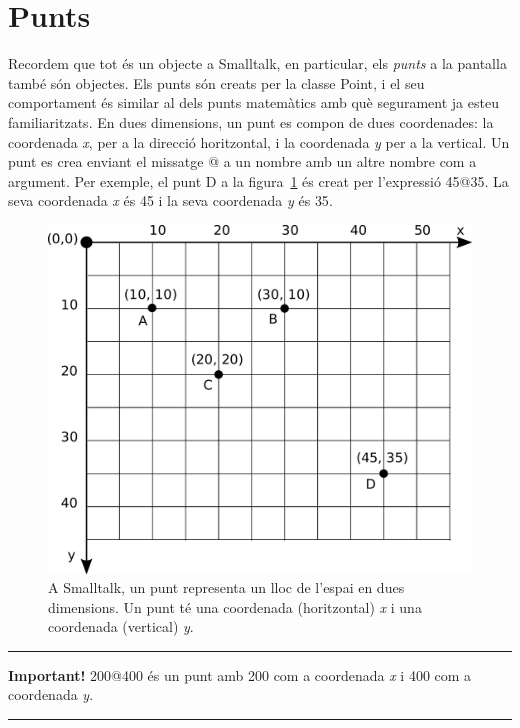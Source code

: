 \section{Punts}
Recordem que tot és un objecte a Smalltalk, en particular, els \emph{punts} a la pantalla també són objectes. Els punts són creats per la classe \textsf{Point}, i el seu comportament és similar al dels punts matemàtics amb què segurament ja esteu familiaritzats. En dues dimensions, un punt es compon de dues coordenades: la coordenada \emph{x}, per a la direcció horitzontal, i la coordenada \emph{y} per a la vertical. Un punt es crea enviant el missatge \textsf{@} a un nombre amb un altre nombre com a argument. Per exemple, el punt D a la figura~\ref{fig2101} és creat per l'expressió \textsf{45@35}. La seva coordenada \emph{x} és \textsf{45} i la seva coordenada \emph{y} és \textsf{35}.
\begin{figure}[h!]
\begin{center}
\includegraphics[scale=0.32]{Imatges/figura21-1}
\end{center}
\caption{A Smalltalk, un punt representa un lloc de l'espai en dues dimensions. Un punt té una coordenada (horitzontal) \emph{x} i una coordenada (vertical) \emph{y}.}
\label{fig2101}
\end{figure}

\noindent
\rule{\textwidth}{2pt}
\noindent
\textbf{Important!} \textsf{200@400} és un punt amb 200 com a coordenada \emph{x} i 400 com a coordenada \emph{y}.\\
\noindent
\rule{\textwidth}{2pt}

